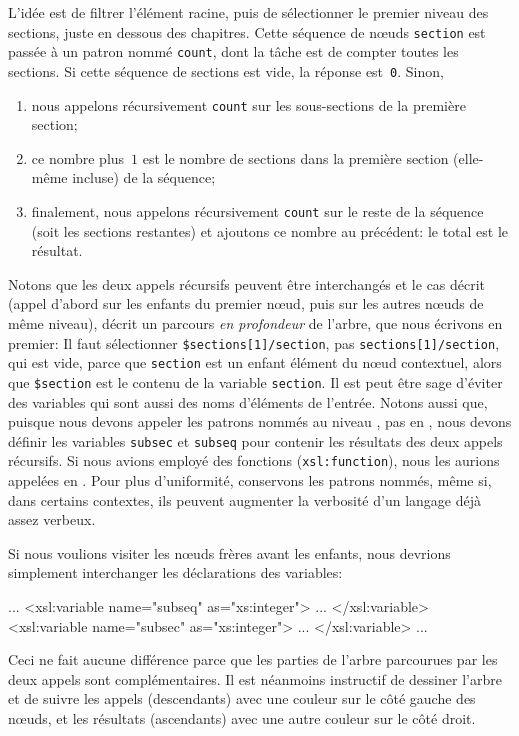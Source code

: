L'idée est de filtrer l'élément racine, puis de sélectionner le
premier niveau des sections, juste en dessous des chapitres. Cette
séquence de n{\oe}uds \texttt{section} est passée à un patron nommé
\texttt{count}, dont la tâche est de compter toutes les sections. Si
cette séquence de sections est vide, la réponse est~\texttt{0}. Sinon,
\begin{enumerate}

\item nous appelons récursivement \texttt{count} sur les sous-sections
  de la première section;

\item ce nombre plus~\(1\) est le nombre de sections dans la première
  section (elle-même incluse) de la séquence;

\item finalement, nous appelons récursivement \texttt{count} sur le
  reste de la séquence (soit les sections restantes) et ajoutons ce
  nombre au précédent: le total est le résultat.

\end{enumerate}
Notons que les deux appels récursifs peuvent être interchangés et le
cas décrit (appel d'abord sur les enfants du premier n{\oe}ud, puis
sur les autres n{\oe}uds de même niveau), décrit un parcours \emph{en
  profondeur} de l'arbre, que nous écrivons en premier:
\noindent Il faut sélectionner \texttt{\$sections[1]/section}, pas
\texttt{sections[1]/section}, qui est vide, parce que \texttt{section}
est un enfant élément du n{\oe}ud contextuel, alors que
\texttt{\$section} est le contenu de la variable \texttt{section}. Il
est peut être sage d'éviter des variables qui sont aussi des noms
d'éléments de l'entrée. Notons aussi que, puisque nous devons appeler
les patrons nommés au niveau \XSLT, pas en \XPath, nous devons définir
les variables \texttt{subsec} et \texttt{subseq} pour contenir les
résultats des deux appels récursifs. Si nous avions employé des
fonctions \XSLT (\texttt{xsl:function}), nous les aurions appelées en
\XPath. Pour plus d'uniformité, conservons les patrons nommés, même
si, dans certains contextes, ils peuvent augmenter la verbosité d'un
langage déjà assez verbeux.

Si nous voulions visiter les n{\oe}uds frères avant les enfants, nous
devrions simplement interchanger les déclarations des variables:
\begin{sverb}
      ...
        <xsl:variable name="subseq" as="xs:integer">
          ...
        </xsl:variable>
        <xsl:variable name="subsec" as="xs:integer">
          ...
        </xsl:variable>
        ...
\end{sverb}
Ceci ne fait aucune différence parce que les parties de l'arbre
parcourues par les deux appels sont complémentaires. Il est néanmoins
instructif de dessiner l'arbre \XML et de suivre les appels
(descendants) avec une couleur sur le côté gauche des n{\oe}uds, et
les résultats (ascendants) avec une autre couleur sur le côté droit.

